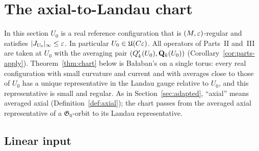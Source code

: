 \section{The axial-to-Landau chart}\label{sec:chart}

In this section $U_0$ is a real reference configuration that is $(M,\varepsilon)$-regular and satisfies $|J_{U_0}|_\infty\le\varepsilon$. In particular $U_0\in\mathfrak U(C\varepsilon)$. All operators of Parts~II and~III are taken at $U_0$ with the averaging pair $(Q'_k(U_0),\mathbf Q_k(U_0))$ (Corollary~\ref{cor:parts-apply}). Theorem~\ref{thm:chart} below is Ba\l aban's \cite[Theorem~2]{BalReg} on a single torus: every real configuration with small curvature and current and with averages close to those of $U_0$ has a unique representative in the Landau gauge relative to $U_0$, and this representative is small and regular. As in Section~\ref{sec:adapted}, ``axial'' means averaged axial (Definition~\ref{def:axial}); the chart passes from the averaged axial representative of a $\mathfrak G_0$-orbit to its Landau representative.

\subsection{Linear input}\label{ss:24.1}

